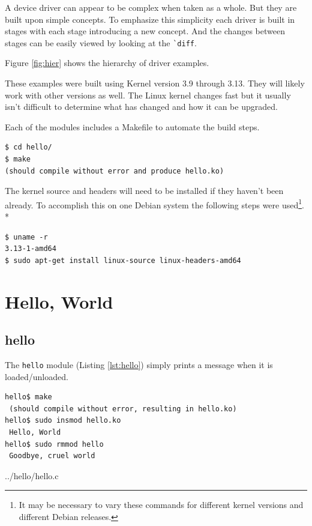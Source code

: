 \documentclass{article}
\begin{document}
A device driver can appear to be complex when taken as a whole.
But they are built upon simple concepts.
To emphasize this simplicity each driver is built in stages with
each stage introducing a new concept.
And the changes between stages can be easily viewed by looking
at the \verb+`diff+.

Figure \ref{fig:hier} shows the hierarchy of driver examples.

These examples were built using Kernel version 3.9 through 3.13.
They will likely work with other versions as well.
The Linux kernel changes fast but it usually isn't difficult to
determine what has changed and how it can be upgraded.

Each of the modules includes a Makefile to automate the build steps.

\begin{verbatim}
$ cd hello/
$ make
(should compile without error and produce hello.ko)
\end{verbatim}

The kernel source and headers will need to be installed if they
haven't been already.
To accomplish this on one Debian\autocite{debian} system the following steps
were used\footnote{It may be necessary to vary these commands
for different kernel versions and different Debian releases.}.
\\*
\begin{Verbatim}[samepage=true]
$ uname -r
3.13-1-amd64
$ sudo apt-get install linux-source linux-headers-amd64
\end{Verbatim}


\section{Hello, World}

\subsection{hello}
\label{sec:hello}

The \verb+hello+ module (Listing \ref{lst:hello}) simply prints a message
when it is loaded/unloaded.

\begin{verbatim}
hello$ make
 (should compile without error, resulting in hello.ko)
hello$ sudo insmod hello.ko
 Hello, World
hello$ sudo rmmod hello
 Goodbye, cruel world
\end{verbatim}


	{../hello/hello.c}
\end{document}

